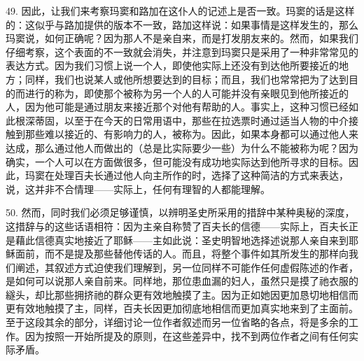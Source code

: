 49. 因此，让我们来考察玛窦和路加在这仆人的记述上是否一致。玛窦的话是这样的：这似乎与路加提供的版本不一致，路加这样说：如果事情是这样发生的，那么玛窦说，如何正确呢？因为那人不是亲自来，而是打发朋友来的。然而，如果我们仔细考察，这个表面的不一致就会消失，并注意到玛窦只是采用了一种非常常见的表达方式。因为我们习惯上说一个人，即使他实际上还没有到达他所要接近的地方；同样，我们也说某人或他所想要达到的目标；而且，我们也常常把为了达到目的而进行的称为，即使那个被称为另一个人的人可能并没有亲眼见到他所接近的人，因为他可能是通过朋友来接近那个对他有帮助的人。事实上，这种习惯已经如此根深蒂固，以至于在今天的日常用语中，那些在拉选票时通过适当人物的中介接触到那些难以接近的、有影响力的人，被称为。因此，如果本身都可以通过他人来达成，那么通过他人而做出的（总是比实际要少一些）为什么不能被称为呢？因为确实，一个人可以在方面做很多，但可能没有成功地实际达到他所寻求的目标。因此，玛窦在处理百夫长通过他人向主所作的时，选择了这种简洁的方式来表达，说，这并非不合情理——实际上，任何有理智的人都能理解。\par

50. 然而，同时我们必须足够谨慎，以辨明圣史所采用的措辞中某种奥秘的深度，这措辞与的这些话语相符：因为主亲自称赞了百夫长的信德——实际上，百夫长正是藉此信德真实地接近了耶稣——主如此说：圣史明智地选择述说那人亲自来到耶稣面前，而不是提及那些替他传话的人。而且，将整个事件如其所发生的那样向我们阐述，其叙述方式迫使我们理解到，另一位同样不可能作任何虚假陈述的作者，是如何可以说那人亲自前来。同样地，那位患血漏的妇人，虽然只是摸了祂衣服的繸头，却比那些拥挤祂的群众更有效地触摸了主。因为正如她因更加恳切地相信而更有效地触摸了主，同样，百夫长因更加彻底地相信而更加真实地来到了主面前。至于这段其余的部分，详细讨论一位作者叙述而另一位省略的各点，将是多余的工作。因为按照一开始所提及的原则，在这些差异中，找不到两位作者之间有任何实际矛盾。\par

